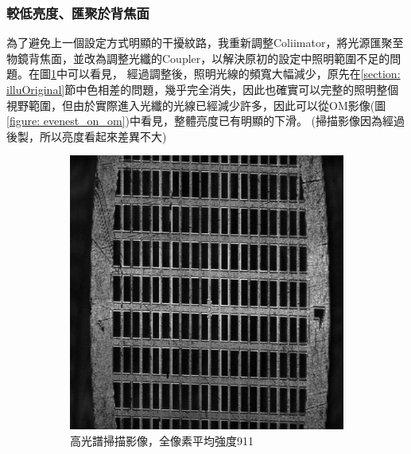 \documentclass[12pt]{article}
\begin{document}
\subsubsection{較低亮度、匯聚於背焦面} \label{illuDark}
為了避免上一個設定方式明顯的干擾紋路，我重新調整Coliimator，將光源匯聚至物鏡背焦面，並改為調整光纖的Coupler，以解決原初的設定中照明範圍不足的問題。在圖\ref{figure: evenest_on}中可以看見，
經過調整後，照明光線的頻寬大幅減少，原先在\ref{section: illuOriginal}節中色相差的問題，幾乎完全消失，因此也確實可以完整的照明整個視野範圍，但由於實際進入光纖的光線已經減少許多，因此可以從OM影像(圖\ref{figure: evenest_on_om})中看見，整體亮度已有明顯的下滑。
(掃描影像因為經過後製，所以亮度看起來差異不大)
\begin{figure}
    \centering
    \begin{subfigure}[t]{0.45\textwidth}
        \centering
        \includegraphics[width=\linewidth]{on_evenest.jpg}
        \caption{高光譜掃描影像，全像素平均強度911}
        \label{figure: evenest_on}
    \end{subfigure}
    \begin{subfigure}[t]{0.45\textwidth}
        \centering

\end{subfigure}
\end{figure}
\end{document}

